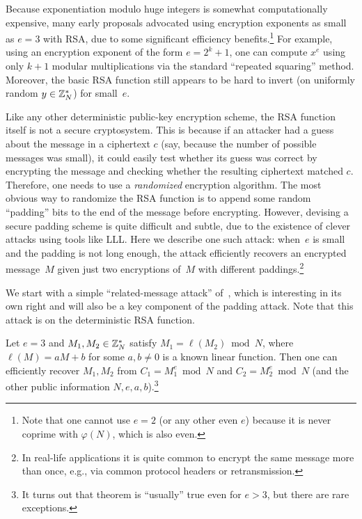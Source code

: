\documentclass[11pt]{article}
\begin{document}
Because exponentiation modulo huge integers is somewhat
computationally expensive, many early proposals advocated using
encryption exponents as small as $e=3$ with RSA, due to some
significant efficiency benefits.\footnote{Note that one cannot use
  $e=2$ (or any other even $e$) because it is never coprime with
  $\varphi(N)$, which is also even.} For example, using an encryption
exponent of the form $e=2^{k}+1$, one can compute $x^{e}$ using only
$k+1$ modular multiplications via the standard ``repeated squaring''
method.  Moreover, the basic RSA function still appears to be hard to
invert (on uniformly random $y \in \mathbb{Z}_{N}^{*}$) for small~$e$.

Like any other deterministic public-key encryption scheme, the RSA
function itself is not a secure cryptosystem. This is because if an
attacker had a guess about the message in a ciphertext $c$ (say,
because the number of possible messages was small), it could easily
test whether its guess was correct by encrypting the message and
checking whether the resulting ciphertext matched $c$. Therefore, one
needs to use a \emph{randomized} encryption algorithm. The most
obvious way to randomize the RSA function is to append some random
``padding'' bits to the end of the message before encrypting. However,
devising a secure padding scheme is quite difficult and subtle, due to
the existence of clever attacks using tools like LLL. Here we describe
one such attack: when~$e$ is small and the padding is not long enough,
the attack efficiently recovers an encrypted message~$M$ given just
two encryptions of~$M$ with different paddings.\footnote{In real-life
  applications it is quite common to encrypt the same message more
  than once, e.g., via common protocol headers or retransmission.}

We start with a simple ``related-message attack''
of~\cite{DBLP:conf/eurocrypt/CoppersmithFPR96}, which is interesting
in its own right and will also be a key component of the padding
attack. Note that this attack is on the deterministic RSA function.

\begin{lemma}
  \label{lem:related-msg}
  Let $e=3$ and $M_1, M_2 \in \mathbb{Z}_{N}^*$ satisfy
  $M_1=\ell(M_2) \bmod N$, where $\ell(M)=aM+b$ for some $a,b\neq 0$
  is a known linear function. Then one can efficiently recover
  $M_1, M_2$ from $C_1=M_1^{e} \bmod N$ and $C_2=M_2^e \bmod N$ (and
  the other public information $N,e,a,b$).\footnote{It turns out that
    theorem is ``usually'' true even for $e>3$, but there are rare
    exceptions.}
\end{lemma}
\end{document}
